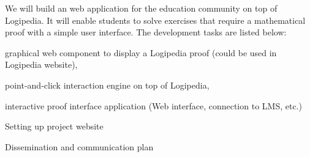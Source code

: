 \begin{workpackage}[id=dissemination,type=MGT,wphases=1-48,
  short={Dissemination},
  title={Dissemination, communication and exploitation},
  lead=Lie,LieRM=3,InrRM=6,BirRM=4,CleRM=2,ImtRM=2,StrRM=2,ZibRM=14,EduRM=12]
\begin{tasklist}
  \begin{task}[id=edukera,
      title=Web teaching interface for doing proofs at school,
      shorttitle=Teach.,
      lead=Edu,EduRM=12,wphases=19-30]
    We will build an web application for the education community on top of Logipedia. It will enable students to solve exercises that require
    a mathematical proof with a simple user interface.
    The development tasks are listed below:
    \begin{compactitem}
    \item graphical web component to display a Logipedia proof (could be used in Logipedia website), 
    \item point-and-click interaction engine on top of Logipedia,
    \item interactive proof interface application (Web interface, connection to LMS, etc.)
    \end{compactitem}
  \end{task}
  
\end{tasklist}

\begin{wpdelivs}



  \begin{wpdeliv}[due=3,id=website-setting,dissem=PU,nature=DEC,lead=Inr,task=com]{Setting up project website}
  \end{wpdeliv}

    \begin{wpdeliv}[due=4,id=website-setting,dissem=PU,nature=DEC,lead=Lie,task=com]{Dissemination and communication plan}\end{wpdeliv}




\end{wpdelivs}
\end{workpackage}
